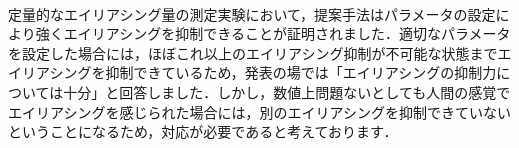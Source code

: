 \begin{qanda}

\item {}\\
定量的なエイリアシング量の測定実験において，提案手法はパラメータの設定により強くエイリアシングを抑制できることが証明されました．適切なパラメータを設定した場合には，ほぼこれ以上のエイリアシング抑制が不可能な状態までエイリアシングを抑制できているため，発表の場では「エイリアシングの抑制力については十分」と回答しました．しかし，数値上問題ないとしても人間の感覚でエイリアシングを感じられた場合には，別のエイリアシングを抑制できていないということになるため，対応が必要であると考えております．


\end{qanda}
